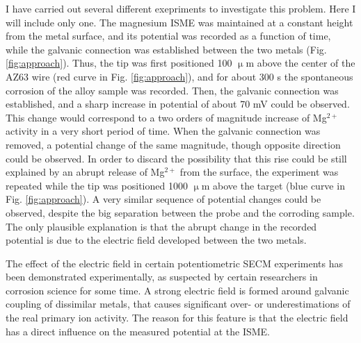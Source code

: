 I have carried out several different exepriments to investigate this problem.
Here I will include only one.
The magnesium ISME was maintained at a constant height from the metal surface, and its potential was recorded as a function of time, while the galvanic connection was established between the two metals (Fig. \ref{fig:approach}).
Thus, the tip was first positioned 100 $\upmu$m above the center of the AZ63 wire (red curve in Fig. \ref{fig:approach}), and for about 300 s the spontaneous corrosion of the alloy sample was recorded.
Then, the galvanic connection was established, and a sharp increase in potential of about 70 mV could be observed.
This change would correspond to a two orders of magnitude increase of Mg$^{2+}$ activity in a very short period of time.
When the galvanic connection was removed, a potential change of the same magnitude, though opposite direction could be observed.
In order to discard the possibility that this rise could be still explained by an abrupt release of Mg$^{2+}$ from the surface, the experiment was repeated while the tip was positioned 1000 $\upmu$m above the target (blue curve in Fig. \ref{fig:approach}).
A very similar sequence of potential changes could be observed, despite the big separation between the probe and the corroding sample.
The only plausible explanation is that the abrupt change in the recorded potential is due to the electric field developed between the two metals. 

The effect of the electric field in certain potentiometric SECM experiments has been demonstrated experimentally, as suspected by certain researchers in corrosion science for some time.
A strong electric field is formed around galvanic coupling of dissimilar metals, that causes significant over- or underestimations of the real primary ion activity.
The reason for this feature is that the electric field has a direct influence on the measured potential at the ISME.
